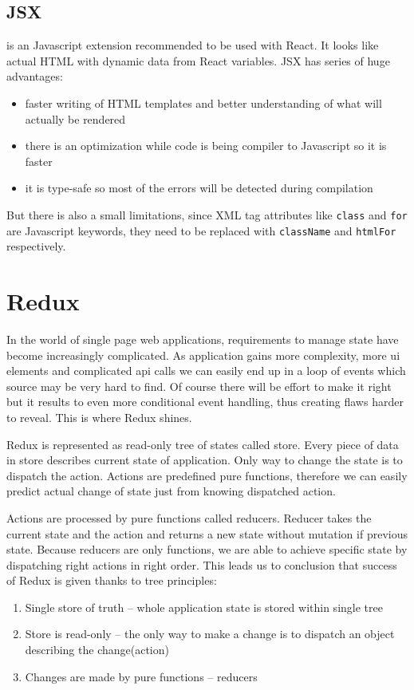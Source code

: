 \subsection{JSX} is an Javascript extension recommended to be used with React. It looks like actual HTML with dynamic data from React variables. JSX has series of huge advantages:
\begin{itemize}
\item faster writing of HTML templates and better understanding of what will actually be rendered
\item there is an optimization while code is being compiler to Javascript so it is faster 
\item it is type-safe so most of the errors will be detected during compilation
\end{itemize}  
But there is also a small limitations, since XML tag attributes like \texttt{class} and \texttt{for} are Javascript keywords, they need to be replaced with \texttt{className} and \texttt{htmlFor} respectively. 

\section{Redux}
In the world of single page web applications, requirements to manage state have become increasingly complicated. As application gains more complexity, more ui elements and complicated api calls we can easily end up in a loop of events which source may be very hard to find. Of course there will be effort to make it right but it results to even more conditional event handling, thus creating flaws harder to reveal. This is where Redux shines.

Redux is represented as read-only tree of states called store. Every piece of data in store describes current state of application. Only way to change the state is to dispatch the action. Actions are predefined pure functions, therefore we can easily predict actual change of state just from knowing dispatched action.

Actions are processed by pure functions called reducers. Reducer takes the current state and the action and returns a new state without mutation if previous state. Because reducers are only functions, we are able to achieve specific state by dispatching right actions in right order. This leads us to conclusion that success of Redux is given thanks to tree principles:
\begin{enumerate}
\item Single store of truth -- whole application state is stored within single tree
\item Store is read-only -- the only way to make a change is to dispatch an object describing the change(action)
\item Changes are made by pure functions -- reducers 
\end{enumerate}


